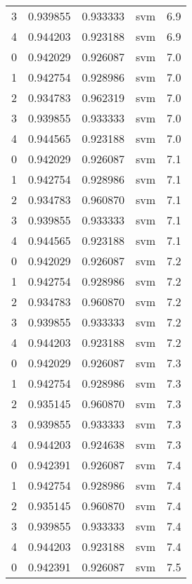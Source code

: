 \begin{tabular}{rrrlr}
     3 & 0.939855 & 0.933333 &      svm &        6.9 \\
     4 & 0.944203 & 0.923188 &      svm &        6.9 \\
     0 & 0.942029 & 0.926087 &      svm &        7.0 \\
     1 & 0.942754 & 0.928986 &      svm &        7.0 \\
     2 & 0.934783 & 0.962319 &      svm &        7.0 \\
     3 & 0.939855 & 0.933333 &      svm &        7.0 \\
     4 & 0.944565 & 0.923188 &      svm &        7.0 \\
     0 & 0.942029 & 0.926087 &      svm &        7.1 \\
     1 & 0.942754 & 0.928986 &      svm &        7.1 \\
     2 & 0.934783 & 0.960870 &      svm &        7.1 \\
     3 & 0.939855 & 0.933333 &      svm &        7.1 \\
     4 & 0.944565 & 0.923188 &      svm &        7.1 \\
     0 & 0.942029 & 0.926087 &      svm &        7.2 \\
     1 & 0.942754 & 0.928986 &      svm &        7.2 \\
     2 & 0.934783 & 0.960870 &      svm &        7.2 \\
     3 & 0.939855 & 0.933333 &      svm &        7.2 \\
     4 & 0.944203 & 0.923188 &      svm &        7.2 \\
     0 & 0.942029 & 0.926087 &      svm &        7.3 \\
     1 & 0.942754 & 0.928986 &      svm &        7.3 \\
     2 & 0.935145 & 0.960870 &      svm &        7.3 \\
     3 & 0.939855 & 0.933333 &      svm &        7.3 \\
     4 & 0.944203 & 0.924638 &      svm &        7.3 \\
     0 & 0.942391 & 0.926087 &      svm &        7.4 \\
     1 & 0.942754 & 0.928986 &      svm &        7.4 \\
     2 & 0.935145 & 0.960870 &      svm &        7.4 \\
     3 & 0.939855 & 0.933333 &      svm &        7.4 \\
     4 & 0.944203 & 0.923188 &      svm &        7.4 \\
     0 & 0.942391 & 0.926087 &      svm &        7.5 \\

\end{tabular}
